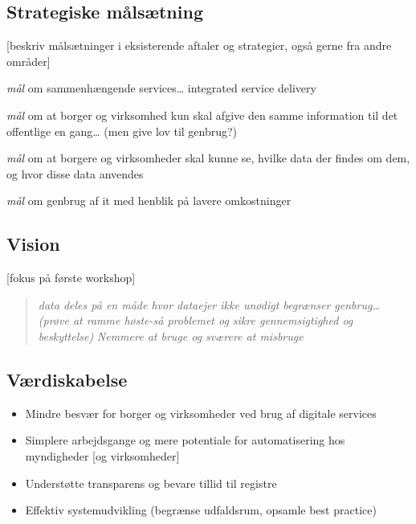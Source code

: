 \subsection{Strategiske målsætning}\label{strategiske-muxe5lsuxe6tning}

{[}beskriv målsætninger i eksisterende aftaler og strategier, også gerne
fra andre områder{]}

\begin{description}
\tightlist
\item[Interoperability]
\emph{mål} om sammenhængende services\ldots{} integrated service
delivery
\item[Once-only]
\emph{mål} om at borger og virksomhed kun skal afgive den samme
information til det offentlige en gang\ldots{} (men give lov til
genbrug?)
\item[Transperancy]
\emph{mål} om at borgere og virksomheder skal kunne se, hvilke data der
findes om dem, og hvor disse data anvendes
\item[Re-use]
\emph{mål} om genbrug af it med henblik på lavere omkostninger
\end{description}

\subsection{Vision}\label{vision}

{[}fokus på første workshop{]}

\begin{quote}
\emph{data deles på en måde hvor dataejer ikke unødigt begrænser
genbrug\ldots{}} \emph{(prøve at ramme høste-så problemet og sikre
gennemsigtighed og beskyttelse)} \emph{Nemmere at bruge og sværere at
misbruge}
\end{quote}

\subsection{Værdiskabelse}\label{vuxe6rdiskabelse}

\begin{itemize}
\tightlist
\item
  Mindre besvær for borger og virksomheder ved brug af digitale services
\item
  Simplere arbejdsgange og mere potentiale for automatisering hos
  myndigheder {[}og virksomheder{]}
\item
  Understøtte transparens og bevare tillid til registre
\item
  Effektiv systemudvikling (begrænse udfaldsrum, opsamle best practice)
\end{itemize}

